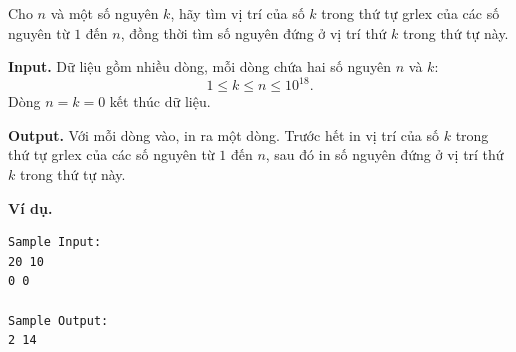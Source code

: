 \documentclass[11pt]{article}
\begin{document}
Cho $n$ và một số nguyên $k$, hãy tìm vị trí của số $k$ trong thứ tự grlex của
các số nguyên từ $1$ đến $n$, đồng thời tìm số nguyên đứng ở vị trí thứ $k$
trong thứ tự này.

\textbf{Input.} Dữ liệu gồm nhiều dòng, mỗi dòng chứa hai số nguyên $n$ và
$k$:
\[
  1\le k\le n\le 10^{18}.
\]
Dòng $n=k=0$ kết thúc dữ liệu.

\textbf{Output.} Với mỗi dòng vào, in ra một dòng. Trước hết in vị trí của số
$k$ trong thứ tự grlex của các số nguyên từ $1$ đến $n$, sau đó in số nguyên
đứng ở vị trí thứ $k$ trong thứ tự này.

\textbf{Ví dụ.}
\begin{verbatim}
Sample Input:
20 10
0 0

Sample Output:
2 14
\end{verbatim}
\end{document}
